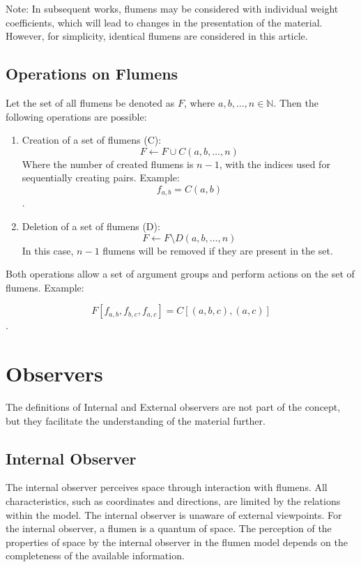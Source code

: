 \documentclass[final]{article}
\begin{document}
        Note: In subsequent works, flumens may be considered with
        individual weight coefficients, which will lead to changes in
        the presentation of the material. However, for simplicity, identical
        flumens are considered in this article.


    \subsection{Operations on Flumens}

        Let the set of all flumens be denoted as \( F \), where \( a, b, \dots,
        n \in \mathbb{N} \). Then the following operations are possible:

        \begin{enumerate}

            \item Creation of a set of flumens (C): \[ F \leftarrow F \cup C(a,b,
            \dots, n) \] Where the number of created flumens is \( n-1 \), with
            the indices used for sequentially creating pairs. Example: \[
            f_{a,b}=C(a,b) \].

            \item Deletion of a set of flumens (D): \[ F \leftarrow F \setminus
            D(a,b, \dots, n) \] In this case, \( n-1 \) flumens will be removed if
            they are present in the set.

        \end{enumerate}

        Both operations allow a set of argument groups and perform
        actions on the set of flumens. Example:

        \[ F[f_{a,b}, f_{b,c}, f_{a,c}] = C[(a,b,c), (a,c)]\].



    \section{Observers}

        The definitions of Internal and External observers are not part of the 
        concept, but they facilitate the understanding of the material further.

        \subsection{Internal Observer}

            The internal observer perceives space through interaction with 
            flumens. All characteristics, such as coordinates and directions, 
            are limited by the relations within the model. The internal observer 
            is unaware of external viewpoints. For the internal observer, a 
            flumen is a quantum of space. The perception of the properties of 
            space by the internal observer in the flumen model depends on the 
            completeness of the available information.
\end{document}
